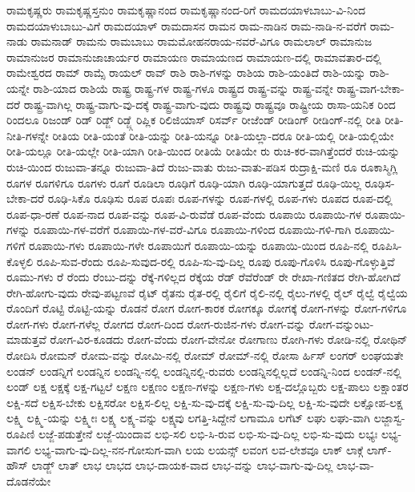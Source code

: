 {ರಾಮಕೃಷ್ಣರು
ರಾಮಕೃಷ್ಣಸ್ತನುಂ
ರಾಮಕೃಷ್ಣಾನಂದ
ರಾಮಕೃಷ್ಣಾನಂದ-ರಿಗೆ
ರಾಮದಯಾಳಬಾಬು-ವಿ-ನಿಂದ
ರಾಮದಯಾಳುಬಾಬು-ವಿಗೆ
ರಾಮದಯಾಳ್
ರಾಮದಾಸನ
ರಾಮನ
ರಾಮ-ನಾಡಿನ
ರಾಮ-ನಾಡಿ-ನ-ವರೆಗೆ
ರಾಮ-ನಾಡು
ರಾಮನಾಡ್
ರಾಮನು
ರಾಮಬಾಬು
ರಾಮಮೋಹನರಾಯ-ನವರೆ-ವಿಗೂ
ರಾಮಲಾಲ್
ರಾಮಾನುಜ
ರಾಮಾನುಜರ
ರಾಮಾನುಜಾಚಾರ್ಯರ
ರಾಮಾಯಣ
ರಾಮಾಯಣದ
ರಾಮಾಯಣ-ದಲ್ಲಿ
ರಾಮಾವತಾರ-ದಲ್ಲಿ
ರಾಮೇಶ್ವರದ
ರಾಮ್
ರಾಮ್ಸೆ
ರಾಯಲ್
ರಾವ್
ರಾಶಿ
ರಾಶಿ-ಗಳನ್ನು
ರಾಶಿಯ
ರಾಶಿ-ಯಂತಿದೆ
ರಾಶಿ-ಯನ್ನು
ರಾಶಿ-ಯನ್ನೇ
ರಾಶಿ-ಯಾದ
ರಾಶಿಯೆ
ರಾಷ್ಟ್ರ
ರಾಷ್ಟ್ರ-ಗಳ
ರಾಷ್ಟ್ರ-ಗಳೂ
ರಾಷ್ಟ್ರದ
ರಾಷ್ಟ್ರ-ವನ್ನು
ರಾಷ್ಟ್ರ-ವನ್ನೇ
ರಾಷ್ಟ್ರ-ವಾಗ-ಬೇಕಾ-ದರೆ
ರಾಷ್ಟ್ರ-ವಾಗಿಲ್ಲ
ರಾಷ್ಟ್ರ-ವಾಗು-ವು-ದಕ್ಕೆ
ರಾಷ್ಟ್ರ-ವಾಗು-ವುದು
ರಾಷ್ಟ್ರವು
ರಾಷ್ಟ್ರವೂ
ರಾಷ್ಟ್ರೀಯ
ರಾಸಾ-ಯನಿಕ
ರಿಂದ
ರಿಂದಲೂ
ರಿಜಂಡ್
ರಿಡ್
ರಿಡ್ಜ್
ರಿಡ್ಜ್ಗೆ
ರಿಪ್ಲಿಕ
ರಿಲಿಜಿಯಾಸ್
ರಿಸರ್ವ್
ರೀಜೆಂಡ್
ರೀಡಿಂಗ್
ರೀಡಿಂಗ್-ನಲ್ಲಿ
ರೀತಿ
ರೀತಿ-ನೀತಿ-ಗಳನ್ನೇ
ರೀತಿಯ
ರೀತಿ-ಯಂತೆ
ರೀತಿ-ಯನ್ನು
ರೀತಿ-ಯನ್ನೂ
ರೀತಿ-ಯಲ್ಲಾ-ದರೂ
ರೀತಿ-ಯಲ್ಲಿ
ರೀತಿ-ಯಲ್ಲಿಯೇ
ರೀತಿ-ಯಲ್ಲೂ
ರೀತಿ-ಯಲ್ಲೇ
ರೀತಿ-ಯಾಗಿ
ರೀತಿ-ಯಿಂದ
ರೀತಿಯೆ
ರೀತಿಯೇ
ರು
ರುಚಿ-ಕರ-ವಾಗಿತ್ತೆಂದರೆ
ರುಚಿ-ಯನ್ನು
ರುಚಿ-ಯಿಂದ
ರುಜುವಾ-ತನ್ನೂ
ರುಜುವಾ-ತಿದೆ
ರುಜು-ವಾತು
ರುಜು-ವಾತು-ಪಡಿಸ
ರುದ್ರಾಕ್ಷಿ-ಮಣಿ
ರೂ
ರೂಕಾಸ್ಮಿಗ್ಲಿ
ರೂಗಳ
ರೂಗಳಿಗೂ
ರೂಗಳು
ರೂಗೆ
ರೂಡಿಲಾ
ರೂಢಿಗೆ
ರೂಢಿ-ಯಾಗಿ
ರೂಢಿ-ಯಾಗುತ್ತದೆ
ರೂಢಿ-ಯಿಲ್ಲ
ರೂಢಿಸ-ಬೇಕಾ-ದರೆ
ರೂಢಿ-ಸಿಕೊ
ರೂಢಿಸು
ರೂಪ
ರೂಪಃ
ರೂಪ-ಗಳನ್ನು
ರೂಪ-ಗಳಲ್ಲಿ
ರೂಪ-ಗಳು
ರೂಪದ
ರೂಪ-ದಲ್ಲಿ
ರೂಪ-ಧಾ-ರಣೆ
ರೂಪ-ನಾದ
ರೂಪ-ವನ್ನು
ರೂಪ-ವಿ-ರುವೆಡೆ
ರೂಪ-ವೆಂದು
ರೂಪಾಯಿ
ರೂಪಾಯಿ-ಗಳ
ರೂಪಾಯಿ-ಗಳನ್ನು
ರೂಪಾಯಿ-ಗಳ-ವರೆಗೆ
ರೂಪಾಯಿ-ಗಳ-ವರೆ-ವಿಗೂ
ರೂಪಾಯಿ-ಗಳಿಂದ
ರೂಪಾಯಿ-ಗಳಿ-ಗಾಗಿ
ರೂಪಾಯಿ-ಗಳಿಗೆ
ರೂಪಾಯಿ-ಗಳು
ರೂಪಾಯಿ-ಗಳೇ
ರೂಪಾಯಿಗೆ
ರೂಪಾಯಿ-ಯನ್ನು
ರೂಪಾಯಿ-ಯಿಂದ
ರೂಪಿ-ನಲ್ಲಿ
ರೂಪಿಸಿ-ಕೊಳ್ಳಲಿ
ರೂಪಿ-ಸುವ-ರೆಂದು
ರೂಪಿ-ಸುವುದ-ರಲ್ಲಿ
ರೂಪಿ-ಸು-ವು-ದಿಲ್ಲ
ರೂಪು
ರೂಪು-ಗೊಳಿಸಿ
ರೂಪು-ಗೊಳ್ಳುತ್ತಿವೆ
ರೂಮು-ಗಳು
ರೆ
ರೆಂದು
ರೆಂಬು-ದನ್ನು
ರೆಕ್ಕೆ-ಗಳಿಲ್ಲದ
ರೆಕ್ಕೆಯ
ರೆಡ್
ರೆವೆರೆಂಡ್
ರೇ
ರೇಖಾ-ಗಣಿತದ
ರೇಗಿ-ಹೋಗಿದೆ
ರೇಗಿ-ಹೋಗು-ವುದು
ರೇವು-ಪಟ್ಟಣವೆ
ರೈಟ್
ರೈತನು
ರೈತ-ರಲ್ಲಿ
ರೈಲಿಗೆ
ರೈಲಿ-ನಲ್ಲಿ
ರೈಲು-ಗಳಲ್ಲಿ
ರೈಲ್
ರೈಲ್ವೆ
ರೈಲ್ವೆಯ
ರೊಂದಿಗೆ
ರೊಟ್ಟಿ
ರೊಟ್ಟಿ-ಯನ್ನು
ರೊಡನೆ
ರೋಗ
ರೋಗ-ಕಾರಕ
ರೋಗಕ್ಕೂ
ರೋಗಕ್ಕೆ
ರೋಗ-ಗಳನ್ನು
ರೋಗ-ಗಳಿಗೂ
ರೋಗ-ಗಳು
ರೋಗ-ಗಳೆಲ್ಲ
ರೋಗದ
ರೋಗ-ದಿಂದ
ರೋಗ-ರುಜಿನ-ಗಳು
ರೋಗ-ವನ್ನು
ರೋಗ-ವನ್ನುಂಟು-ಮಾಡುತ್ತವೆ
ರೋಗ-ವಿರ-ಕೂಡದು
ರೋಗ-ವೆಂದು
ರೋಗ-ವೇನೋ
ರೋಗಾಣು
ರೋಗಿ-ಗಳು
ರೋಡಿ-ನಲ್ಲಿ
ರೋಥಿನ್
ರೋದಿಸಿ
ರೋಮನ್
ರೋಮ-ವನ್ನು
ರೋಮಿ-ನಲ್ಲಿ
ರೋಮ್
ರೋಮ್-ನಲ್ಲಿ
ರೋಸಾ
ರ್ಹಿಸ್
ಲಂಗರ್
ಲಂಘಯತೇ
ಲಂಡನ್
ಲಂಡನ್ನಿಗೆ
ಲಂಡನ್ನಿನ
ಲಂಡನ್ನಿ-ನಲ್ಲಿ
ಲಂಡನ್ನಿನಲ್ಲಿ-ರುವರು
ಲಂಡನ್ನಿನಲ್ಲಿಲ್ಲದೆ
ಲಂಡನ್ನಿ-ನಿಂದ
ಲಂಡನ್-ನಲ್ಲಿ
ಲಂಡ್
ಲಕ್ಷ
ಲಕ್ಷಕ್ಕೆ
ಲಕ್ಷ-ಗಟ್ಟಲೆ
ಲಕ್ಷಣ
ಲಕ್ಷಣಂ
ಲಕ್ಷಣ-ಗಳನ್ನು
ಲಕ್ಷಣ-ಗಳು
ಲಕ್ಷ-ದಲ್ಲೊಬ್ಬರು
ಲಕ್ಷ-ಪಾಲು
ಲಕ್ಷಾಂತರ
ಲಕ್ಷಿ-ಸದೆ
ಲಕ್ಷಿಸ-ಬೇಕು
ಲಕ್ಷಿಸರೋ
ಲಕ್ಷಿಸ-ಲಿಲ್ಲ
ಲಕ್ಷಿ-ಸು-ವು-ದಕ್ಕೆ
ಲಕ್ಷಿ-ಸು-ವು-ದಿಲ್ಲ
ಲಕ್ಷಿ-ಸು-ವುದೇ
ಲಕ್ಷೋಪ-ಲಕ್ಷ
ಲಕ್ಷ್ಮಿ
ಲಕ್ಷ್ಮಿ-ಯನ್ನು
ಲಕ್ಷ್ಮೀಃ
ಲಕ್ಷ್ಯ
ಲಕ್ಷ್ಯ-ವನ್ನು
ಲಕ್ಷ್ಯವು
ಲಗತ್ತಿ-ಸಿದ್ದೇನೆ
ಲಗಾಮೂ
ಲಗೆಟ್
ಲಘು
ಲಘು-ವಾಗಿ
ಲಜ್ಜಾಸ್ವ-ರೂಪಿಣಿ
ಲಜ್ಜೆ-ಪಡುತ್ತೇನೆ
ಲಜ್ಜೆ-ಯಿಂದಾವ
ಲಭಿ-ಸಲಿ
ಲಭಿ-ಸಿ-ರುವ
ಲಭಿ-ಸು-ವು-ದಿಲ್ಲ
ಲಭಿ-ಸು-ವುದು
ಲಭ್ಯಃ
ಲಭ್ಯ-ವಾಗಲಿ
ಲಭ್ಯ-ವಾಗು-ವು-ದಿಲ್ಲ-ನನ-ಗೋಸುಗ-ವಾಗಿ
ಲಯ
ಲಯನ್ಸ್
ಲವಂಗ
ಲವ-ಲೇಶವೂ
ಲಾಕ್
ಲಾಕ್ಗೆ
ಲಾಗ್-ಹೌಸ್
ಲಾಡ್ಜ್
ಲಾತ್
ಲಾಭ
ಲಾಭದ
ಲಾಭ-ದಾಯಕ-ವಾದ
ಲಾಭ-ವನ್ನು
ಲಾಭ-ವಾಗು-ವು-ದಿಲ್ಲ
ಲಾಭ-ವಾ-ದೊಡನೆಯೇ
}
